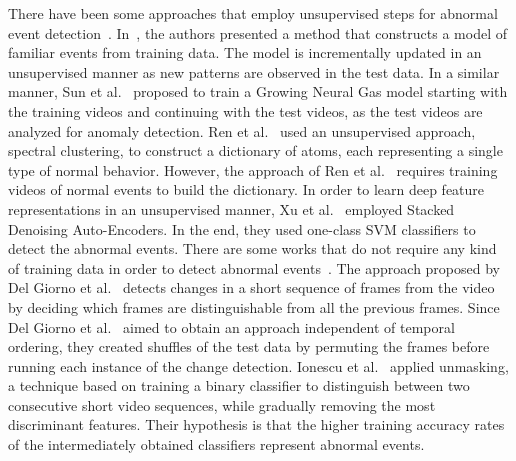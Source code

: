 \documentclass[10pt,twocolumn,letterpaper]{article}
\begin{document}
There have been some approaches that employ unsupervised steps for abnormal event detection~\cite{Dutta-AAAI-2015,Ren-BMVC-2015,Sun-PR-2017,Xu-BMVC-2015}. In~\cite{Dutta-AAAI-2015}, the authors presented a method that constructs a model of familiar events from training data. The model is incrementally updated in an unsupervised manner as new patterns are observed in the test data. In a similar manner, Sun et al.~\cite{Sun-PR-2017} proposed to train a Growing Neural Gas model starting with the training videos and continuing with the test videos, as the test videos are analyzed for anomaly detection. Ren et al.~\cite{Ren-BMVC-2015} used an unsupervised approach, spectral clustering, to construct a dictionary of atoms, each representing a single type of normal behavior. However, the approach of Ren et al.~\cite{Ren-BMVC-2015} requires training videos of normal events to build the dictionary. In order to learn deep feature representations in an unsupervised manner, Xu et al.~\cite{Xu-BMVC-2015} employed Stacked Denoising Auto-Encoders. In the end, they used one-class SVM classifiers to detect the abnormal events. There are some works that do not require any kind of training data in order to detect abnormal events~\cite{Giorno-ECCV-2016,Ionescu-ICCV-2017}. The approach proposed by Del Giorno et al.~\cite{Giorno-ECCV-2016} detects changes in a short sequence of frames from the video by deciding which frames are distinguishable from all the previous frames. Since Del Giorno et al.~\cite{Giorno-ECCV-2016} aimed to obtain an approach independent of temporal ordering, they created shuffles of the test data by permuting the frames before running each instance of the change detection. Ionescu et al.~\cite{Ionescu-ICCV-2017} applied unmasking, a technique based on training a binary classifier to distinguish between two consecutive short video sequences, while gradually removing the most discriminant features. Their hypothesis is that the higher training accuracy rates of the intermediately obtained classifiers represent abnormal events. 
\end{document}
